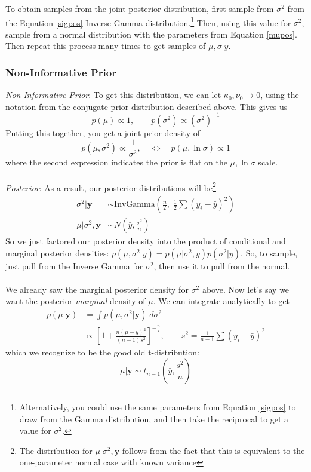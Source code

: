 \documentclass[a4paper,12pt]{scrartcl}
\begin{document}
To obtain samples from the joint posterior distribution, first sample
from $\sigma^2$ from the Equation \ref{sigpos} Inverse Gamma
distribution.\footnote{Alternatively, you could use the same parameters
from Equation \ref{sigpos} to draw from the Gamma distribution, and
then take the reciprocal to get a value for $\sigma^2$.}
Then, using this value for $\sigma^2$, sample from a normal distribution
with the parameters from Equation \ref{mupos}. Then repeat this
process many times to get samples of $\mu,\sigma|y$.

\subsubsection{Non-Informative Prior}

{\sl Non-Informative Prior}: To get this distribution, we can let
$\kappa_0, \nu_0\rightarrow 0$, using the notation from the conjugate
prior distribution described above. This gives us
   \[ p(\mu) \propto 1, \qquad p(\sigma^2) \propto (\sigma^2)^{-1} \]
Putting this together, you get a joint prior density of
   \[ p(\mu, \sigma^2) \propto \frac{1}{\sigma^2}, \quad\Leftrightarrow
      \quad p(\mu, \ln \sigma) \propto 1 \]
where the second expression indicates the prior is flat on the 
$\mu, \ln \sigma$ scale. 
\\
\\
{\sl Posterior}: As a result, our posterior distributions
will be\footnote{The distribution
      for $\mu|\sigma^2,\mathbf{y}$ follows from the fact that this
      is equivalent to the one-parameter normal case with known
      variance}
\begin{align*}
   \sigma^2 | \mathbf{y} &\sim \text{InvGamma}\left(\frac{n}{2}, \;
   \frac{1}{2} \sum (y_i - \bar{y})^2 \right)\\
   \mu | \sigma^2, \mathbf{y} &\sim N\left(\bar{y}, \frac{\sigma^2}{n}
      \right) \qquad \qquad  
\end{align*}
So we just factored our posterior density into the product of conditional
and marginal posterior densities: $p(\mu, \sigma^2 |y) = 
p(\mu|\sigma^2,y) p(\sigma^2|y)$.
So, to sample, just pull from the Inverse Gamma for $\sigma^2$, 
then use it to pull from the normal.
\\
\\
We already saw the marginal posterior density for $\sigma^2$ above. 
Now let's say we want the posterior \emph{marginal} density of $\mu$. We 
can integrate analytically to get
\begin{align*}
   p(\mu|\mathbf{y}) &= \int p(\mu,\sigma^2| \mathbf{y}) \; d\sigma^2\\
   &\propto \left[ 1 + \frac{n(\mu-\bar{y})^2}{(n-1)s^2} \right]^{-
      \frac{n}{2} }, \qquad s^2 = \frac{1}{n-1} \sum (y_i - \bar{y})^2
\end{align*}
which we recognize to be the good old t-distribution:
\[ \mu|\mathbf{y} \sim t_{n-1}\left(\bar{y}, \frac{s^2}{n}\right) \]
\end{document}
